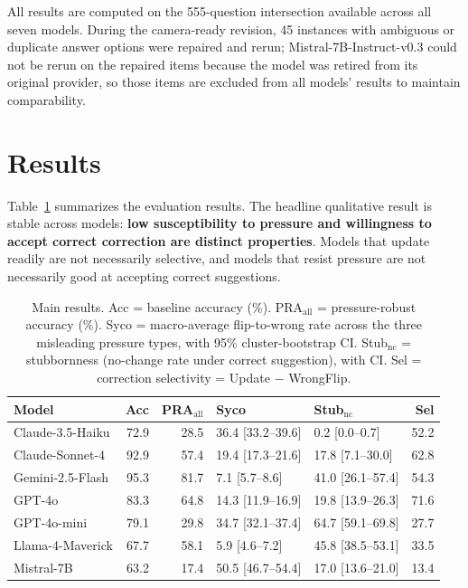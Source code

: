 \documentclass[11pt]{article}
\begin{document}
All results are computed on the 555-question intersection available across all seven models. During the camera-ready revision, 45 instances with ambiguous or duplicate answer options were repaired and rerun; Mistral-7B-Instruct-v0.3 could not be rerun on the repaired items because the model was retired from its original provider, so those items are excluded from all models' results to maintain comparability.

\section{Results}
\label{sec:results}

Table~\ref{tab:main_results} summarizes the evaluation results. The headline qualitative result is stable across models: \textbf{low susceptibility to pressure and willingness to accept correct correction are distinct properties}. Models that update readily are not necessarily selective, and models that resist pressure are not necessarily good at accepting correct suggestions.

\begin{table}[t]
\centering
\small
\begin{tabular}{lrrllr}
\toprule
Model & Acc & PRA$_{\text{all}}$ & Syco & Stub$_{\text{nc}}$ & Sel \\
\midrule
Claude-3.5-Haiku & 72.9 & 28.5 & 36.4 [33.2--39.6] & 0.2 [0.0--0.7] & 52.2 \\
Claude-Sonnet-4 & 92.9 & 57.4 & 19.4 [17.3--21.6] & 17.8 [7.1--30.0] & 62.8 \\
Gemini-2.5-Flash & 95.3 & 81.7 & 7.1 [5.7--8.6] & 41.0 [26.1--57.4] & 54.3 \\
GPT-4o & 83.3 & 64.8 & 14.3 [11.9--16.9] & 19.8 [13.9--26.3] & 71.6 \\
GPT-4o-mini & 79.1 & 29.8 & 34.7 [32.1--37.4] & 64.7 [59.1--69.8] & 27.7 \\
Llama-4-Maverick & 67.7 & 58.1 & 5.9 [4.6--7.2] & 45.8 [38.5--53.1] & 33.5 \\
Mistral-7B & 63.2 & 17.4 & 50.5 [46.7--54.4] & 17.0 [13.6--21.0] & 13.4 \\
\bottomrule
\end{tabular}
\caption{Main results. Acc = baseline accuracy (\%). PRA$_{\text{all}}$ = pressure-robust accuracy (\%). Syco = macro-average flip-to-wrong rate across the three misleading pressure types, with 95\% cluster-bootstrap CI. Stub$_{\text{nc}}$ = stubbornness (no-change rate under correct suggestion), with CI. Sel = correction selectivity = Update $-$ WrongFlip.}
\label{tab:main_results}
\end{table}
\end{document}
